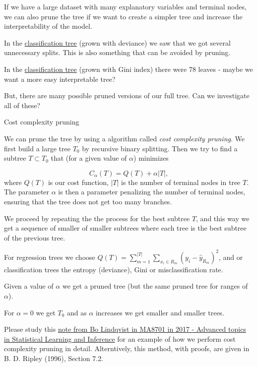 \documentclass[ignorenonframetext,]{beamer}
\begin{document}
\begin{frame}

If we have a large dataset with many explanatory variables and terminal
nodes, we can also prune the tree if we want to create a simpler tree
and increase the interpretability of the model.

In the \protect\hyperlink{classtree2}{classification tree} (grown with
deviance) we saw that we got several unnecessary splits. This is also
something that can be avoided by pruning.

In the \protect\hyperlink{classtree3}{classification tree} (grown with
Gini index) there were 78 leaves - maybe we want a more easy
interpretable tree?

But, there are many possible pruned versions of our full tree. Can we
investigate all of these?

\end{frame}

\begin{frame}

\begin{block}{Cost complexity pruning}

We can prune the tree by using a algorithm called \emph{cost complexity
pruning}. We first build a large tree \(T_0\) by recursive binary
splitting. Then we try to find a subtree \(T\subset T_0\) that (for a
given value of \(\alpha\)) minimizes

\[
C_{\alpha}(T)=Q(T)+\alpha |T|,
\] where \(Q(T)\) is our cost function, \(|T|\) is the number of
terminal nodes in tree \(T\). The parameter \(\alpha\) is then a
parameter penalizing the number of terminal nodes, ensuring that the
tree does not get too many branches.

We proceed by repeating the the process for the best subtree \(T\), and
this way we get a sequence of smaller of smaller subtrees where each
tree is the best subtree of the previous tree.

For regression trees we choose
\(Q(T)=\sum_{m=1}^{|T|}\sum_{x_i\in R_m}(y_i - \hat{y}_{R_m})^2\), and
or classification trees the entropy (deviance), Gini or
misclassification rate.

\end{block}

\end{frame}

\begin{frame}

Given a value of \(\alpha\) we get a pruned tree (but the same pruned
tree for ranges of \(\alpha\)).

For \(\alpha=0\) we get \(T_0\) and as \(\alpha\) increases we get
smaller and smaller trees.

Please study this
\href{https://www.math.ntnu.no/emner/TMA4268/2018v/notes/CART1MA87012017BoLindqvist.pdf}{note
from Bo Lindqvist in MA8701 in 2017 - Advanced topics in Statistical
Learning and Inference} for an example of how we perform cost complexity
pruning in detail. Alterntively, this method, with proofs, are given in
B. D. Ripley (1996), Section 7.2.

\end{frame}
\end{document}
